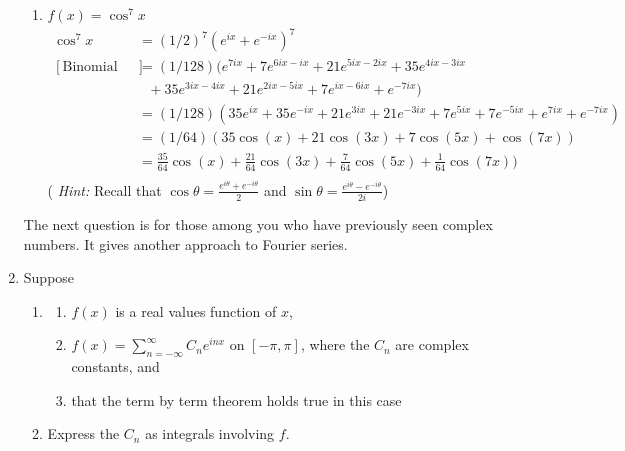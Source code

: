 \documentclass{article}
\begin{document}
\begin{enumerate}
\begin{enumerate}
\item $f(x) = \cos^7x$
\begin{align*}
\cos^7x &= (1/2)^7(e^{ix} + e^{-ix})^7 \\
[\text{Binomial Theorem}]&= (1/128)(e^{7ix} + 7e^{6ix-ix} + 21e^{5ix-2ix}+35e^{4ix-3ix} \\
& \: \: \: + 35e^{3ix-4ix} + 21e^{2ix-5ix} + 7e^{ix-6ix} + e^{-7ix} )\\
&= (1/128)(35e^{ix} + 35e^{-ix} + 21e^{3ix}+21e^{-3ix} +7e^{5ix} + 7e^{-5ix}+ e^{7ix} + e^{-7ix} )\\
&= (1/64)(35\cos(x) + 21\cos(3x) + 7\cos(5x) + \cos(7x))\\
&= \frac{35}{64}\cos(x) + \frac{21}{64}\cos(3x) + \frac{7}{64}\cos(5x) + \frac{1}{64}\cos(7x))\\
\end{align*}
( \textit{Hint:} Recall that $\cos \theta = \frac{e^{i\theta} + e^{-i\theta}}{2}$ and $\sin \theta = \frac{e^{i\theta} - e^{-i\theta}}{2i}$)
\end{enumerate}

The next question is for those among you who have previously seen complex numbers. It gives another approach to Fourier series.

\item Suppose
\begin{enumerate}
\item[] {}

\begin{enumerate}
\item $f(x)$ is a real values function of $x$,
\item $\displaystyle f(x) = \sum_{n=-\infty}^\infty C_ne^{inx}$ on $[-\pi, \pi ]$, where the $C_n$ are complex constants, and
\item that the term by term theorem holds true in this case
\end{enumerate}


\item Express the $C_n$ as integrals involving $f$.


\end{enumerate}
\end{enumerate}
\end{document}
